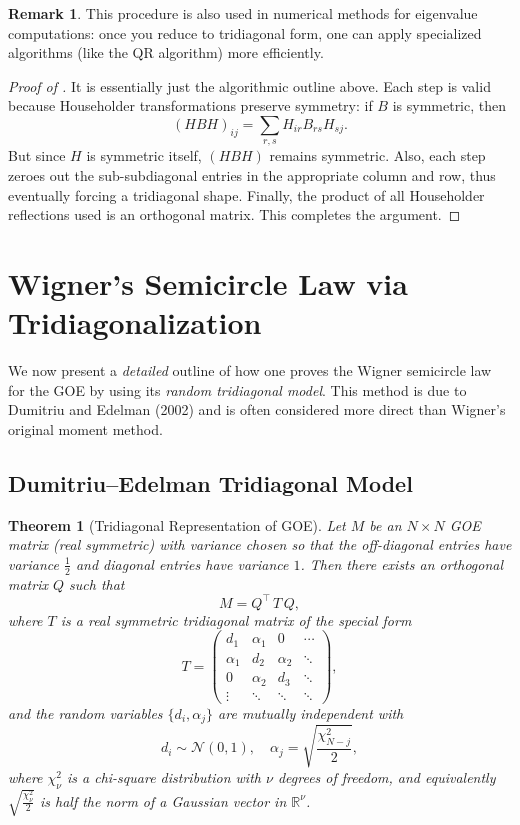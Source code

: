 \documentclass[letterpaper,11pt,oneside,reqno]{article}
\numberwithin{equation}{section}
\newtheorem{theorem}[proposition]{Theorem}
\theoremstyle{definition}
\newtheorem{remark}[proposition]{Remark}
\begin{document}
\begin{remark}
This procedure is also used in numerical methods for eigenvalue computations: once you reduce to tridiagonal form, one can apply specialized algorithms (like the QR algorithm) more efficiently.
\end{remark}

\begin{proof}[Proof of ]
It is essentially just the algorithmic outline above.  Each step is valid because Householder transformations preserve symmetry: if \(B\) is symmetric, then
\[
  (H B H)_{ij}
  = \sum_{r,s} H_{ir} B_{rs} H_{sj}.
\]
But since \(H\) is symmetric itself, \((H B H)\) remains symmetric.  Also, each step zeroes out the sub-subdiagonal entries in the appropriate column and row, thus eventually forcing a tridiagonal shape.  Finally, the product of all Householder reflections used is an orthogonal matrix. This completes the argument.
\end{proof}

\section{Wigner’s Semicircle Law via Tridiagonalization}
\label{sec:Wigner-SC-detailed}

We now present a \emph{detailed} outline of how one proves the Wigner semicircle law for the GOE by using its \emph{random tridiagonal model}. This method is due to Dumitriu and Edelman (2002) and is often considered more direct than Wigner’s original moment method.

\subsection{Dumitriu–Edelman Tridiagonal Model}

\begin{theorem}[Tridiagonal Representation of GOE]
\label{thm:DE-model}
Let \(M\) be an \(N\times N\) GOE matrix (real symmetric) with variance chosen so that the off-diagonal entries have variance \(\tfrac12\) and diagonal entries have variance \(1\).  Then there exists an orthogonal matrix \(Q\) such that
\[
   M = Q^\top\,T\,Q,
\]
where \(T\) is a real symmetric tridiagonal matrix of the special form
\[
   T = \begin{pmatrix}
         d_1 & \alpha_1 & 0 & \cdots \\
         \alpha_1 & d_2 & \alpha_2 & \ddots \\
         0 & \alpha_2 & d_3 & \ddots \\
         \vdots & \ddots & \ddots & \ddots
       \end{pmatrix},
\]
and the random variables \(\{d_i,\alpha_j\}\) are mutually independent with
\[
  d_i \sim \mathcal{N}(0,1),
  \quad
  \alpha_j = \sqrt{\frac{\chi^2_{N-j}}{2}},
\]
where \(\chi^2_{\nu}\) is a chi-square distribution with \(\nu\) degrees of freedom, and equivalently \(\sqrt{\tfrac{\chi^2_\nu}{2}}\) is half the norm of a Gaussian vector in \(\mathbb{R}^\nu\).
\end{theorem}
\end{document}

